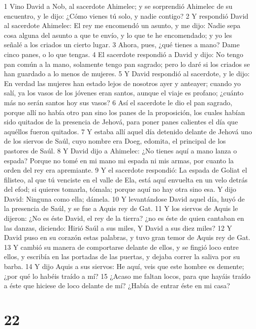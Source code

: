 1 Vino David a Nob, al sacerdote Ahimelec; y se sorprendió Ahimelec de su encuentro, y le dijo: ¿Cómo vienes tú solo, y nadie contigo?
2 Y respondió David al sacerdote Ahimelec: El rey me encomendó un asunto, y me dijo: Nadie sepa cosa alguna del asunto a que te envío, y lo que te he encomendado; y yo les señalé a los criados un cierto lugar.
3 Ahora, pues, ¿qué tienes a mano? Dame cinco panes, o lo que tengas.
4 El sacerdote respondió a David y dijo: No tengo pan común a la mano, solamente tengo pan sagrado; pero lo daré si los criados se han guardado a lo menos de mujeres.
5 Y David respondió al sacerdote, y le dijo: En verdad las mujeres han estado lejos de nosotros ayer y anteayer; cuando yo salí, ya los vasos de los jóvenes eran santos, aunque el viaje es profano; ¿cuánto más no serán santos hoy sus vasos?
6 Así el sacerdote le dio el pan sagrado, porque allí no había otro pan sino los panes de la proposición, los cuales habían sido quitados de la presencia de Jehová, para poner panes calientes el día que aquéllos fueron quitados.
7 Y estaba allí aquel día detenido delante de Jehová uno de los siervos de Saúl, cuyo nombre era Doeg, edomita, el principal de los pastores de Saúl.
8 Y David dijo a Ahimelec: ¿No tienes aquí a mano lanza o espada? Porque no tomé en mi mano mi espada ni mis armas, por cuanto la orden del rey era apremiante.
9 Y el sacerdote respondió: La espada de Goliat el filisteo, al que tú venciste en el valle de Ela, está aquí envuelta en un velo detrás del efod; si quieres tomarla, tómala; porque aquí no hay otra sino esa. Y dijo David: Ninguna como ella; dámela.
10 Y levantándose David aquel día, huyó de la presencia de Saúl, y se fue a Aquis rey de Gat.
11 Y los siervos de Aquis le dijeron: ¿No es éste David, el rey de la tierra? ¿no es éste de quien cantaban en las danzas, diciendo:
Hirió Saúl a sus miles,
Y David a sus diez miles? 
12 Y David puso en su corazón estas palabras, y tuvo gran temor de Aquis rey de Gat.
13 Y cambió su manera de comportarse delante de ellos, y se fingió loco entre ellos, y escribía en las portadas de las puertas, y dejaba correr la saliva por su barba.
14 Y dijo Aquis a sus siervos: He aquí, veis que este hombre es demente; ¿por qué lo habéis traído a mí?
15 ¿Acaso me faltan locos, para que hayáis traído a éste que hiciese de loco delante de mí? ¿Había de entrar éste en mi casa?

\chapter{22}

